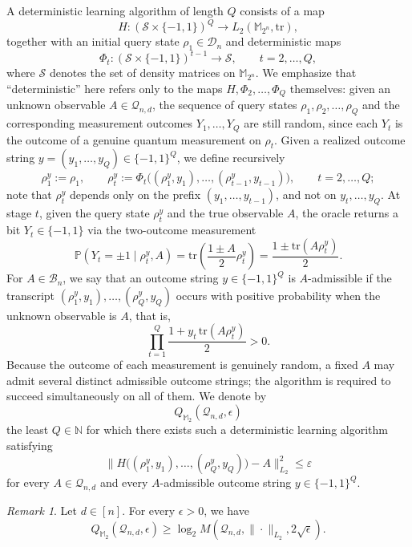 \documentclass{amsbook}
\theoremstyle{definition}
\theoremstyle{remark}
\newtheorem{remark}[theorem]{Remark}
\numberwithin{section}{chapter}
\numberwithin{equation}{chapter}
\newcommand{\M}{\mathbb{M}}
\newcommand{\1}{\mathbf{1}}
\begin{document}
A deterministic learning algorithm of length $Q$ consists of a map
\[
H : (\mathcal{S} \times \{-1,1\})^Q \to L_2(\mathbb{M}_{2^n}, \mathrm{tr}),
\]
together with an initial query state $\rho_1 \in \mathcal{D}_n$ and deterministic maps
\[
\Phi_t : (\mathcal{S}\times \{-1,1\})^{t-1} \to \mathcal{S}, \qquad t = 2, \dots, Q,
\]
where $\mathcal{S}$ denotes the set of density matrices on $\mathbb M_{2^n}$. We emphasize that ``deterministic'' here refers only to the maps $H, \Phi_2, \dots, \Phi_Q$ themselves: given an unknown observable $A \in \mathcal{Q}_{n,d}$, the sequence of query states $\rho_1, \rho_2, \dots, \rho_Q$ and the corresponding measurement outcomes $Y_1, \dots, Y_Q$ are still random, since each $Y_t$ is the outcome of a genuine quantum measurement on $\rho_t$. Given a realized outcome string $y = (y_1, \dots, y_Q) \in \{-1,1\}^Q$, we define recursively
\[
\rho_1^y := \rho_1, \qquad \rho_t^y := \Phi_t\big((\rho_1^y, y_1), \dots, (\rho_{t-1}^y, y_{t-1})\big), \qquad t = 2, \dots, Q;
\]
note that $\rho_t^y$ depends only on the prefix $(y_1, \dots, y_{t-1})$, and not on $y_t, \dots, y_Q$. At stage $t$, given the query state $\rho_t^y$ and the true observable $A$, the oracle returns a bit $Y_t \in \{-1,1\}$ via the two-outcome measurement
\[
\mathbb{P}(Y_t = \pm 1 \mid \rho_t^y, A) = \mathrm{tr}\left(\frac{1 \pm A}{2} \rho_t^y\right) = \frac{1 \pm \mathrm{tr}(A \rho_t^y)}{2}.
\]
For $A \in \mathcal{B}_n$, we say that an outcome string $y \in \{-1,1\}^Q$ is $A$-admissible if the transcript $(\rho_1^y, y_1), \dots, (\rho_Q^y, y_Q)$ occurs with positive probability when the unknown observable is $A$, that is,
\[
\prod_{t=1}^{Q} \frac{1 + y_t \, \mathrm{tr}(A \rho_t^y)}{2} > 0.
\]
Because the outcome of each measurement is genuinely random, a fixed $A$ may admit several distinct admissible outcome strings; the algorithm is required to succeed simultaneously on all of them. We denote by
\[
Q_{\M_2}(\mathcal{Q}_{n,d},\epsilon)
\]
the least $Q \in \mathbb{N}$ for which there exists such a deterministic learning algorithm satisfying
\begin{equation}\label{H-de}
	\big\| H\big((\rho_1^y, y_1), \dots, (\rho_Q^y, y_Q)\big) - A \big\|_{L_2}^2 \le \varepsilon
\end{equation}
for every $A \in \mathcal{Q}_{n,d}$ and every $A$-admissible outcome string $y \in \{-1,1\}^Q$.
\begin{remark}
Let $d\in [n]$.	For every $\epsilon>0$, we have
	\begin{equation}\label{Qb-19}
		Q_{\M_2}(\mathcal Q_{n,d},\epsilon)
		\ge \log_2 M(\mathcal Q_{n,d},\|\cdot\|_{L_2},2\sqrt{\epsilon}).
	\end{equation}
\end{remark}
\end{document}
